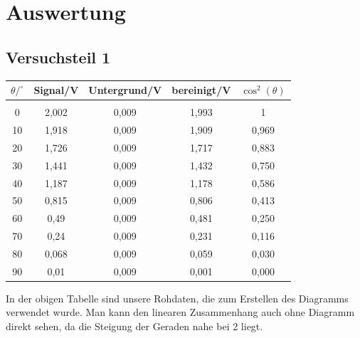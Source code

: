 \newpage

\section{Auswertung}

\subsection*{Versuchsteil 1}



\begin{center}
\begin{tabular}{c|c|c|c|c}
	$\theta/^\circ$ & Signal/V & Untergrund/V & bereinigt/V & $\cos^2(\theta)$ \\
	\hline
	&      &      &      &  \\
	0    & 2,002 & 0,009 & 1,993 & 1 \\
	10   & 1,918 & 0,009 & 1,909 & 0,969 \\
	20   & 1,726 & 0,009 & 1,717 & 0,883 \\
	30   & 1,441 & 0,009 & 1,432 & 0,750 \\
	40   & 1,187 & 0,009 & 1,178 & 0,586 \\
	50   & 0,815 & 0,009 & 0,806 & 0,413 \\
	60   & 0,49 & 0,009 & 0,481 & 0,250 \\
	70   & 0,24 & 0,009 & 0,231 & 0,116 \\
	80   & 0,068 & 0,009 & 0,059 & 0,030 \\
	90   & 0,01 & 0,009 & 0,001 & 0,000 \\
\end{tabular}	
\end{center}

In der obigen Tabelle sind unsere Rohdaten, die zum Erstellen des Diagramms verwendet wurde. Man kann den linearen Zusammenhang auch ohne Diagramm direkt sehen, da die Steigung der Geraden nahe bei 2 liegt.



\begin{figure}[H]
\end{figure}

